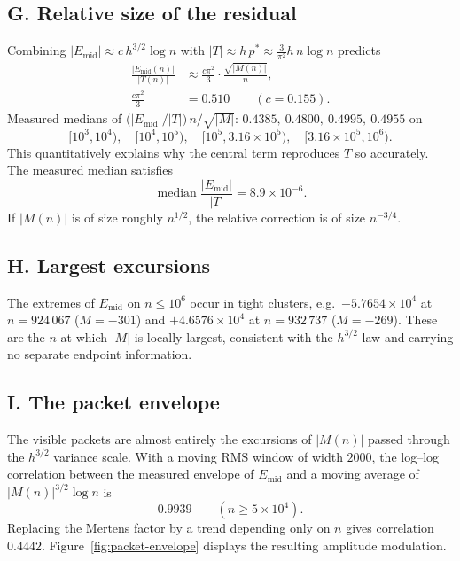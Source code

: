 \documentclass[11pt]{amsart}
\numberwithin{equation}{section}
\theoremstyle{plain}
\theoremstyle{definition}
\theoremstyle{remark}
\newcommand{\Mert}{M}
\begin{document}
\subsection{G. Relative size of the residual}
\label{sec:num-relative}
Combining $|E_{\mathrm{mid}}|\approx c\,h^{3/2}\log n$ with $|T|\approx
h\,p^{*}\approx \tfrac{3}{\pi^{2}}h\,n\log n$ predicts
\begin{equation}
\label{eq:relative-residual-prediction}
\begin{aligned}
\frac{|E_{\mathrm{mid}}(n)|}{|T(n)|}
&\approx \frac{c\pi^{2}}{3}\cdot\frac{\sqrt{|\Mert(n)|}}{n},\\
\frac{c\pi^{2}}{3}&=0.510 \qquad (c=0.155).
\end{aligned}
\end{equation}
Measured medians of $\bigl(|E_{\mathrm{mid}}|/|T|\bigr)\,n/\sqrt{|\Mert|}$:
$0.4385,\ 0.4800,\ 0.4995,\ 0.4955$ on
\begin{equation}
\label{eq:relative-residual-ranges}
[10^{3},10^{4}),\quad [10^{4},10^{5}),\quad
[10^{5},3.16\times10^{5}),\quad [3.16\times10^{5},10^{6}).
\end{equation}
This quantitatively explains why the central term reproduces $T$ so accurately.
The measured median satisfies
\begin{equation}
\label{eq:median-relative-residual}
\operatorname{median}\frac{|E_{\mathrm{mid}}|}{|T|}=8.9\times10^{-6}.
\end{equation}
If $|\Mert(n)|$ is of size roughly $n^{1/2}$, the relative correction is of
size $n^{-3/4}$.

\subsection{H. Largest excursions}
\label{sec:num-extremes}
The extremes of $E_{\mathrm{mid}}$ on $n\le10^{6}$ occur in tight clusters,
e.g.\ $-5.7654\times10^{4}$ at $n=924\,067$ ($\Mert=-301$) and
$+4.6576\times10^{4}$ at $n=932\,737$ ($\Mert=-269$). These are the $n$ at which
$|\Mert|$ is locally largest, consistent with the $h^{3/2}$ law and carrying no
separate endpoint information.

\subsection{I. The packet envelope}
\label{sec:num-packets}
The visible packets are almost entirely the excursions of $|\Mert(n)|$ passed
through the $h^{3/2}$ variance scale. With a moving RMS window of width $2000$,
the log--log correlation between the measured envelope of $E_{\mathrm{mid}}$
and a moving average of $|\Mert(n)|^{3/2}\log n$ is
\begin{equation}
\label{eq:packet-correlation}
0.9939\qquad(n\ge5\times10^4).
\end{equation}
Replacing the Mertens factor by a trend depending only on $n$ gives correlation
$0.4442$. Figure~\ref{fig:packet-envelope} displays the resulting amplitude
modulation.
\end{document}
